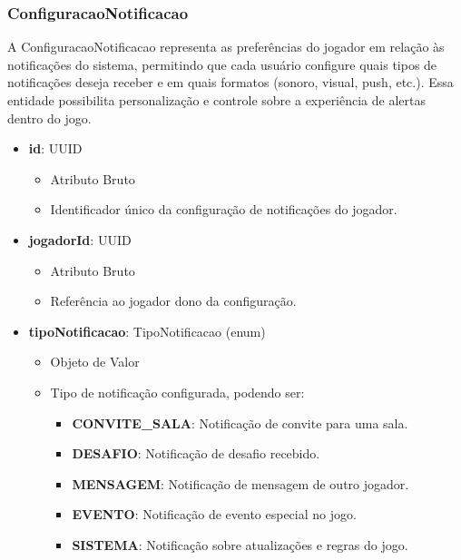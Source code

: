     \subsubsection{ConfiguracaoNotificacao}
    A ConfiguracaoNotificacao representa as preferências do jogador em relação às notificações do sistema, permitindo que cada usuário configure quais tipos de notificações deseja receber e em quais formatos (sonoro, visual, push, etc.). Essa entidade possibilita personalização e controle sobre a experiência de alertas dentro do jogo.
    \begin{itemize}
        \item \textbf{id}: UUID  
              \begin{itemize}
                  \item Atributo Bruto
                  \item Identificador único da configuração de notificações do jogador.
              \end{itemize}
    
        \item \textbf{jogadorId}: UUID  
              \begin{itemize}
                  \item Atributo Bruto
                  \item Referência ao jogador dono da configuração.
              \end{itemize}
    
        \item \textbf{tipoNotificacao}: TipoNotificacao (enum)  
              \begin{itemize}
                  \item Objeto de Valor
                  \item Tipo de notificação configurada, podendo ser:
                  \begin{itemize}
                      \item \textbf{CONVITE\_SALA}: Notificação de convite para uma sala.
                      \item \textbf{DESAFIO}: Notificação de desafio recebido.
                      \item \textbf{MENSAGEM}: Notificação de mensagem de outro jogador.
                      \item \textbf{EVENTO}: Notificação de evento especial no jogo.
                      \item \textbf{SISTEMA}: Notificação sobre atualizações e regras do jogo.
                  \end{itemize}
              \end{itemize}
    

\end{itemize}
